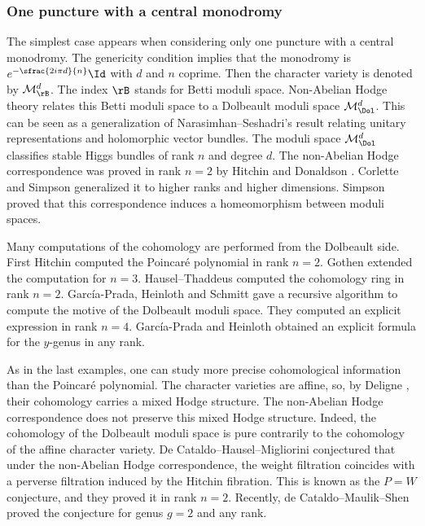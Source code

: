 \subsubsection{One puncture with a central monodromy}
The simplest case appears when considering only one puncture with a central monodromy. The genericity condition implies that the monodromy is $e^{-\sfrac{2 i \pi d}{n}} \Id$ with $d$ and $n$ coprime. Then the character variety is denoted by $\mathcal{M}_{\rB}^d$. The index $\rB$ stands for Betti moduli space. Non-Abelian Hodge theory relates this Betti moduli space to a Dolbeault moduli space $\mathcal{M}^d_{\Dol}$. This can be seen as a generalization of Narasimhan--Seshadri's result \cite{Narasimhan_Seshadri} relating unitary representations and holomorphic vector bundles. The moduli space $\mathcal{M}^d_{\Dol}$ classifies stable Higgs bundles of rank $n$ and degree $d$. The non-Abelian Hodge correspondence was proved in rank $n=2$ by Hitchin \cite{Hitchin87} and Donaldson \cite{Donaldson}. Corlette \cite{Corlette} and Simpson \cite{Simpson_88,Simpson1992HiggsBA} generalized it to higher ranks and higher dimensions. Simpson \cite{Simpson_94_I,Simpson_94_II} proved that this correspondence induces a homeomorphism between moduli spaces.

Many computations of the cohomology are performed from the Dolbeault side. First Hitchin \cite{Hitchin87} computed the Poincaré polynomial in rank $n=2$. Gothen \cite{Gothen} extended the computation for $n=3$. Hausel--Thaddeus \cite{Hausel_Thaddeus_03,Hausel_Thaddeus_2004} computed the cohomology ring in rank $n=2$. García-Prada, Heinloth and Schmitt \cite{Garcia_Heinloth_Schmitt} gave a recursive algorithm to compute the motive of the Dolbeault moduli space. They computed an explicit expression in rank $n=4$. García-Prada and Heinloth \cite{Garcia_Prada_Heinloth_y_genus} obtained an explicit formula for the $y$-genus in any rank.

As in the last examples, one can study more precise cohomological information than the Poincaré polynomial. The character varieties are affine, so, by Deligne \cite{Deligne_Hodge}, their cohomology carries a mixed Hodge structure. The non-Abelian Hodge correspondence does not preserve this mixed Hodge structure. Indeed, the cohomology of the Dolbeault moduli space is pure contrarily to the cohomology of the affine character variety. De Cataldo--Hausel--Migliorini \cite{de_Cataldo_Hausel_Migliorini_PW} conjectured that under the non-Abelian Hodge correspondence, the weight filtration coincides with a perverse filtration induced by the Hitchin fibration. This is known as the $P=W$ conjecture, and they proved it in rank $n=2$. Recently, de Cataldo--Maulik--Shen \cite{deCataldo_Maulik_Shen} proved the conjecture for genus $g=2$ and any rank.

